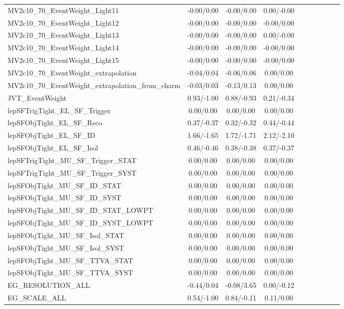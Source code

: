 \begin{table}[h]
\begin{center}
\begin{tabular}{l|ccccccccc}
MV2c10\_70\_EventWeight\_Light11 &-0.00/0.00 &-0.00/0.00 &0.00/-0.00 \\
MV2c10\_70\_EventWeight\_Light12 &-0.00/0.00 &-0.00/0.00 &-0.00/0.00 \\
MV2c10\_70\_EventWeight\_Light13 &-0.00/0.00 &-0.00/0.00 &0.00/-0.00 \\
MV2c10\_70\_EventWeight\_Light14 &-0.00/0.00 &-0.00/0.00 &-0.00/0.00 \\
MV2c10\_70\_EventWeight\_Light15 &-0.00/0.00 &-0.00/0.00 &-0.00/0.00 \\
MV2c10\_70\_EventWeight\_extrapolation &-0.04/0.04 &-0.06/0.06 &0.00/0.00 \\
MV2c10\_70\_EventWeight\_extrapolation\_from\_charm &-0.03/0.03 &-0.13/0.13 &0.00/0.00 \\
JVT\_EventWeight &0.93/-1.00 &0.88/-0.93 &0.21/-0.34 \\
lepSFTrigTight\_EL\_SF\_Trigger &0.00/0.00 &0.00/0.00 &0.00/0.00 \\
lepSFObjTight\_EL\_SF\_Reco &0.37/-0.37 &0.32/-0.32 &0.44/-0.44 \\
lepSFObjTight\_EL\_SF\_ID &1.66/-1.65 &1.72/-1.71 &2.12/-2.10 \\
lepSFObjTight\_EL\_SF\_Isol &0.46/-0.46 &0.38/-0.38 &0.37/-0.37 \\
lepSFTrigTight\_MU\_SF\_Trigger\_STAT &0.00/0.00 &0.00/0.00 &0.00/0.00 \\
lepSFTrigTight\_MU\_SF\_Trigger\_SYST &0.00/0.00 &0.00/0.00 &0.00/0.00 \\
lepSFObjTight\_MU\_SF\_ID\_STAT &0.00/0.00 &0.00/0.00 &0.00/0.00 \\
lepSFObjTight\_MU\_SF\_ID\_SYST &0.00/0.00 &0.00/0.00 &0.00/0.00 \\
lepSFObjTight\_MU\_SF\_ID\_STAT\_LOWPT &0.00/0.00 &0.00/0.00 &0.00/0.00 \\
lepSFObjTight\_MU\_SF\_ID\_SYST\_LOWPT &0.00/0.00 &0.00/0.00 &0.00/0.00 \\
lepSFObjTight\_MU\_SF\_Isol\_STAT &0.00/0.00 &0.00/0.00 &0.00/0.00 \\
lepSFObjTight\_MU\_SF\_Isol\_SYST &0.00/0.00 &0.00/0.00 &0.00/0.00 \\
lepSFObjTight\_MU\_SF\_TTVA\_STAT &0.00/0.00 &0.00/0.00 &0.00/0.00 \\
lepSFObjTight\_MU\_SF\_TTVA\_SYST &0.00/0.00 &0.00/0.00 &0.00/0.00 \\
EG\_RESOLUTION\_ALL &-0.44/0.04 &-0.08/3.65 &0.00/-0.12 \\
EG\_SCALE\_ALL &0.54/-1.00 &0.84/-0.11 &0.11/0.00 \\

\end{tabular}
\end{center}
\end{table}
